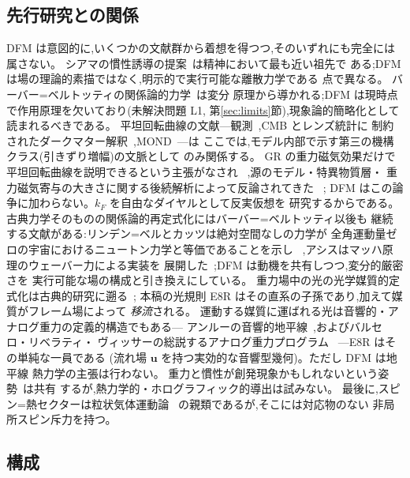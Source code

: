 \documentclass[a4paper,10pt,twocolumn]{ltjsarticle}
\newcommand{\vect}[1]{\bm{#1}}
\begin{document}
\subsection{先行研究との関係}
\label{sec:prior}

DFM は意図的に,いくつかの文献群から着想を得つつ,そのいずれにも完全には
属さない。
シアマの慣性誘導の提案~\cite{Sciama1953}は精神において最も近い祖先で
ある;DFM は場の理論的素描ではなく,明示的で実行可能な離散力学である
点で異なる。
バーバー=ベルトッティの関係論的力学~\cite{BarbourBertotti1982}は変分
原理から導かれる;DFM は現時点で作用原理を欠いており(未解決問題 L1,
第\ref{sec:limits}節),現象論的簡略化として読まれるべきである。
平坦回転曲線の文献---観測~\cite{RubinFord1970},CMB とレンズ統計に
制約されたダークマター解釈~\cite{Planck2018},MOND~\cite{Milgrom1983}---は
ここでは,モデル内部で示す第三の機構クラス(引きずり増幅)の文脈として
のみ関係する。
GR の重力磁気効果だけで平坦回転曲線を説明できるという主張がなされ
~\cite{CooperstockTieu2005,Ludwig2021},源のモデル・特異物質層・
重力磁気寄与の大きさに関する後続解析によって反論されてきた
~\cite{FuchsPhleps2006,Korzynski2007,LasenbyHobsonBarker2023};
DFM はこの論争に加わらない。$k_F$ を自由なダイヤルとして反実仮想を
研究するからである。
古典力学そのものの関係論的再定式化にはバーバー=ベルトッティ以後も
継続する文献がある:リンデン=ベルとカッツは絶対空間なしの力学が
全角運動量ゼロの宇宙におけるニュートン力学と等価であることを示し
~\cite{LyndenBellKatz1995},アシスはマッハ原理のウェーバー力による実装を
展開した~\cite{Assis1999};DFM は動機を共有しつつ,変分的厳密さを
実行可能な場の構成と引き換えにしている。
重力場中の光の光学媒質的定式化は古典的研究に遡る~\cite{deFelice1971};
本稿の光規則 E8R はその直系の子孫であり,加えて媒質がフレーム場によって
\emph{移流}される。
運動する媒質に運ばれる光は音響的・アナログ重力の定義的構造でもある---
アンルーの音響的地平線~\cite{Unruh1981},およびバルセロ・リベラティ・
ヴィッサーの総説するアナログ重力プログラム
~\cite{BarceloLiberatiVisser2005}---E8R はその単純な一員である
(流れ場 $\vect{u}$ を持つ実効的な音響型幾何)。ただし DFM は地平線
熱力学の主張は行わない。
重力と慣性が創発現象かもしれないという姿勢~\cite{Verlinde2017}は共有
するが,熱力学的・ホログラフィック的導出は試みない。
最後に,スピン=熱セクターは粒状気体運動論
~\cite{BrilliantovPoschel2004}の親類であるが,そこには対応物のない
非局所スピン斥力を持つ。

\subsection{構成}
\end{document}
